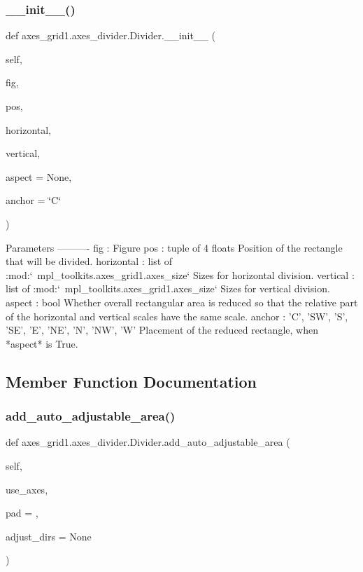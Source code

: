 \subsubsection{\texorpdfstring{\+\_\+\+\_\+init\+\_\+\+\_\+()}{\_\_init\_\_()}}
{\footnotesize\ttfamily def axes\+\_\+grid1.\+axes\+\_\+divider.\+Divider.\+\_\+\+\_\+init\+\_\+\+\_\+ (\begin{DoxyParamCaption}\item[{}]{self,  }\item[{}]{fig,  }\item[{}]{pos,  }\item[{}]{horizontal,  }\item[{}]{vertical,  }\item[{}]{aspect = {\ttfamily None},  }\item[{}]{anchor = {\ttfamily \char`\"{}C\char`\"{}} }\end{DoxyParamCaption})}

\begin{DoxyVerb}Parameters
----------
fig : Figure
pos : tuple of 4 floats
    Position of the rectangle that will be divided.
horizontal : list of :mod:`~mpl_toolkits.axes_grid1.axes_size`
    Sizes for horizontal division.
vertical : list of :mod:`~mpl_toolkits.axes_grid1.axes_size`
    Sizes for vertical division.
aspect : bool
    Whether overall rectangular area is reduced so that the relative
    part of the horizontal and vertical scales have the same scale.
anchor : {'C', 'SW', 'S', 'SE', 'E', 'NE', 'N', 'NW', 'W'}
    Placement of the reduced rectangle, when *aspect* is True.
\end{DoxyVerb}
 

\subsection{Member Function Documentation}
\mbox{\label{classaxes__grid1_1_1axes__divider_1_1Divider_a2419ca7e83c8de2445c725e6d1c770e5}} 
\subsubsection{\texorpdfstring{add\+\_\+auto\+\_\+adjustable\+\_\+area()}{add\_auto\_adjustable\_area()}}
{\footnotesize\ttfamily def axes\+\_\+grid1.\+axes\+\_\+divider.\+Divider.\+add\+\_\+auto\+\_\+adjustable\+\_\+area (\begin{DoxyParamCaption}\item[{}]{self,  }\item[{}]{use\+\_\+axes,  }\item[{}]{pad = {},  }\item[{}]{adjust\+\_\+dirs = {\ttfamily None} }\end{DoxyParamCaption})}

